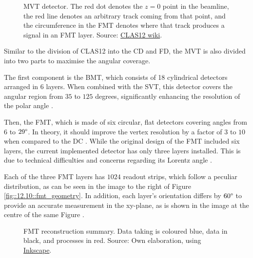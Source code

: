     \begin{figure}[b!]
        \centering{}
        \caption[MVT detector.]{MVT detector.
        The red dot denotes the $z=0$ point in the beamline, the red line denotes an arbitrary track coming from that point, and the circumference in the FMT denotes where that track produces a signal in an FMT layer.
        Source: \href{https://jlab.org/physics/hall-b/clas12}{CLAS12 wiki}.}
        \label{fig::12.10::micromegas_vertex_tracker}
    \end{figure}

    Similar to the division of CLAS12 into the CD and FD, the MVT is also divided into two parts to maximise the angular coverage.

    The first component is the BMT, which consists of 18 cylindrical detectors arranged in 6 layers.
    When combined with the SVT, this detector covers the angular region from $35$ to $125$ degrees, significantly enhancing the resolution of the polar angle \cite{acker2020mvt}.

    Then, the FMT, which is made of six circular, flat detectors covering angles from $6$ to $29\degree$.
    In theory, it should improve the vertex resolution by a factor of $3$ to $10$ when compared to the DC \cite{aune2009}.
    While the original design of the FMT included six layers, the current implemented detector has only three layers installed.
    This is due to technical difficulties and concerns regarding its Lorentz angle \cite{konczykowski2010}.

    Each of the three FMT layers has $1024$ readout strips, which follow a peculiar distribution, as can be seen in the image to the right of Figure \ref{fig::12.10::fmt_geometry}.
    In addition, each layer's orientation differs by $60\degree$ to provide an accurate measurement in the xy-plane, as is shown in the image at the centre of the same Figure \cite{acker2020mvt}.

    \begin{wrapfigure}{r}{0.50\textwidth}
        \centering{}
        \caption[FMT reconstruction summary]{FMT reconstruction summary.
        Data taking is coloured blue, data in black, and processes in red.
        Source: Own elaboration, using \href{https://inkscape.org/}{Inkscape}.}
        \label{fig::12.11::fmt_reconstruction}
    \end{wrapfigure}

